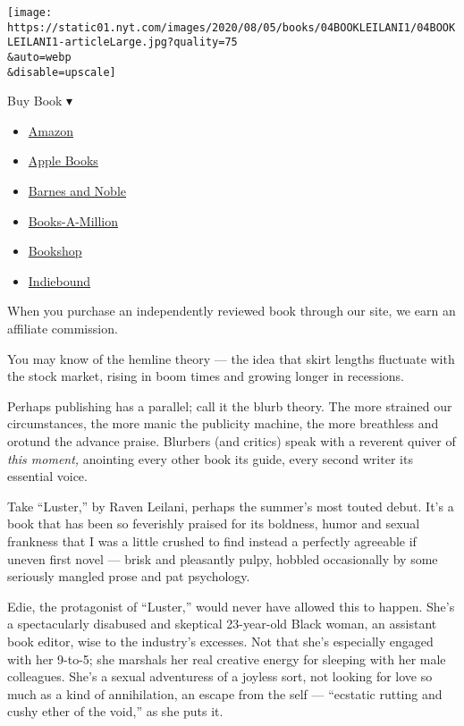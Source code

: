 \texttt{[image: https://static01.nyt.com/images/2020/08/05/books/04BOOKLEILANI1/04BOOKLEILANI1-articleLarge.jpg?quality=75\\\&auto=webp\\\&disable=upscale]}

Buy Book ▾

\begin{itemize}
\tightlist
\item
  \href{https://www.amazon.com/gp/search?index=books\&tag=NYTBSREV-20\&field-keywords=Luster+Raven+Leilani}{Amazon}
\item
  \href{https://du-gae-books-dot-nyt-du-prd.appspot.com/buy?title=Luster\&author=Raven+Leilani}{Apple
  Books}
\item
  \href{https://www.anrdoezrs.net/click-7990613-11819508?url=https\%3A\%2F\%2Fwww.barnesandnoble.com\%2Fw\%2F\%3Fean\%3D9780374194321}{Barnes
  and Noble}
\item
  \href{https://www.anrdoezrs.net/click-7990613-35140?url=https\%3A\%2F\%2Fwww.booksamillion.com\%2Fp\%2FLuster\%2FRaven\%2BLeilani\%2F9780374194321}{Books-A-Million}
\item
  \href{https://bookshop.org/a/3546/9780374194321}{Bookshop}
\item
  \href{https://www.indiebound.org/book/9780374194321?aff=NYT}{Indiebound}
\end{itemize}

When you purchase an independently reviewed book through our site, we
earn an affiliate commission.

You may know of the hemline theory --- the idea that skirt lengths
fluctuate with the stock market, rising in boom times and growing longer
in recessions.

Perhaps publishing has a parallel; call it the blurb theory. The more
strained our circumstances, the more manic the publicity machine, the
more breathless and orotund the advance praise. Blurbers (and critics)
speak with a reverent quiver of \emph{this moment,} anointing every
other book its guide, every second writer its essential voice.

Take ``Luster,'' by Raven Leilani, perhaps the summer's most touted
debut. It's a book that has been so feverishly praised for its boldness,
humor and sexual frankness that I was a little crushed to find instead a
perfectly agreeable if uneven first novel --- brisk and pleasantly
pulpy, hobbled occasionally by some seriously mangled prose and pat
psychology.

Edie, the protagonist of ``Luster,'' would never have allowed this to
happen. She's a spectacularly disabused and skeptical 23-year-old Black
woman, an assistant book editor, wise to the industry's excesses. Not
that she's especially engaged with her 9-to-5; she marshals her real
creative energy for sleeping with her male colleagues. She's a sexual
adventuress of a joyless sort, not looking for love so much as a kind of
annihilation, an escape from the self --- ``ecstatic rutting and cushy
ether of the void,'' as she puts it.

